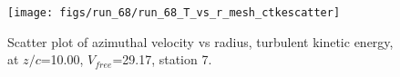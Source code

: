 \begin{figure}[H]
\centering
\texttt{[image: figs/run\_68/run\_68\_T\_vs\_r\_mesh\_ctkescatter]}
\caption{Scatter plot of azimuthal velocity vs radius, turbulent kinetic energy, at $z/c$=10.00, $V_{free}$=29.17, station 7.}
\label{fig:run_68_T_vs_r_mesh_ctkescatter}
\end{figure}


